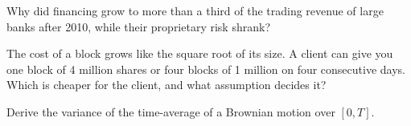 \begin{interviewq}\label{iq:m1:the-sell-side:4}
Why did financing grow to more than a third of the trading revenue of large
banks after 2010, while their proprietary risk shrank?
\end{interviewq}

\begin{interviewq}\label{iq:m1:the-sell-side:5}
The cost of a block grows like the square root of its size. A client can
give you one block of 4 million shares or four blocks of 1 million on four
consecutive days. Which is cheaper for the client, and what assumption
decides it?
\end{interviewq}

\begin{interviewq}\label{iq:m1:the-sell-side:6}
Derive the variance of the time-average of a Brownian motion over $[0,T]$.
\end{interviewq}
